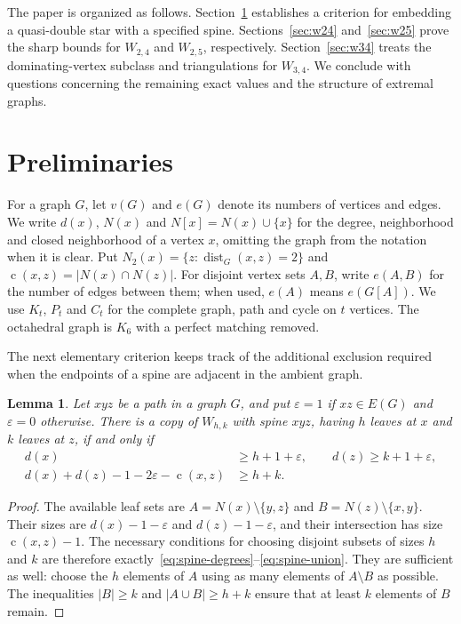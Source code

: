 \documentclass[11pt,a4paper]{article}
\newtheorem{lemma}[theorem]{Lemma}
\theoremstyle{remark}
\newcommand{\cdeg}{\operatorname{c}}
\newcommand{\dist}{\operatorname{dist}}
\begin{document}
The paper is organized as follows. Section~\ref{sec:preliminaries} establishes a criterion for embedding a quasi-double star with a specified spine. Sections~\ref{sec:w24} and~\ref{sec:w25} prove the sharp bounds for $W_{2,4}$ and $W_{2,5}$, respectively. Section~\ref{sec:w34} treats the dominating-vertex subclass and triangulations for $W_{3,4}$. We conclude with questions concerning the remaining exact values and the structure of extremal graphs.

\section{Preliminaries}\label{sec:preliminaries}

For a graph $G$, let $v(G)$ and $e(G)$ denote its numbers of vertices and edges. We write $d(x)$, $N(x)$ and $N[x]=N(x)\cup\{x\}$ for the degree, neighborhood and closed neighborhood of a vertex $x$, omitting the graph from the notation when it is clear. Put $N_2(x)=\{z:\dist_G(x,z)=2\}$ and $\cdeg(x,z)=|N(x)\cap N(z)|$. For disjoint vertex sets $A,B$, write $e(A,B)$ for the number of edges between them; when used, $e(A)$ means $e(G[A])$. We use $K_t$, $P_t$ and $C_t$ for the complete graph, path and cycle on $t$ vertices. The octahedral graph is $K_6$ with a perfect matching removed.

The next elementary criterion keeps track of the additional exclusion required when the endpoints of a spine are adjacent in the ambient graph.

\begin{lemma}\label{lem:spine}
Let $xyz$ be a path in a graph $G$, and put $\varepsilon=1$ if $xz\in E(G)$ and $\varepsilon=0$ otherwise. There is a copy of $W_{h,k}$ with spine $xyz$, having $h$ leaves at $x$ and $k$ leaves at $z$, if and only if
\begin{align}
d(x)&\ge h+1+\varepsilon,\qquad d(z)\ge k+1+\varepsilon,\label{eq:spine-degrees}\\
d(x)+d(z)-1-2\varepsilon-\cdeg(x,z)&\ge h+k.\label{eq:spine-union}
\end{align}
\end{lemma}

\begin{proof}
The available leaf sets are $A=N(x)\setminus\{y,z\}$ and $B=N(z)\setminus\{x,y\}$. Their sizes are $d(x)-1-\varepsilon$ and $d(z)-1-\varepsilon$, and their intersection has size $\cdeg(x,z)-1$. The necessary conditions for choosing disjoint subsets of sizes $h$ and $k$ are therefore exactly~\eqref{eq:spine-degrees}--\eqref{eq:spine-union}. They are sufficient as well: choose the $h$ elements of $A$ using as many elements of $A\setminus B$ as possible. The inequalities $|B|\ge k$ and $|A\cup B|\ge h+k$ ensure that at least $k$ elements of $B$ remain.
\end{proof}
\end{document}
